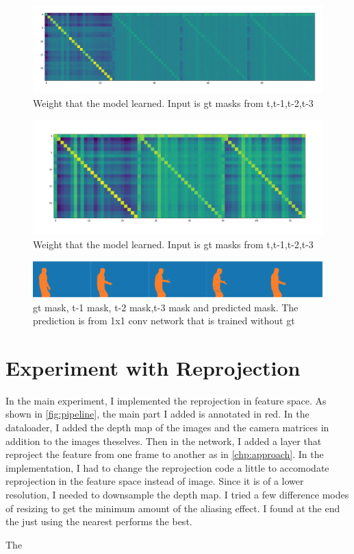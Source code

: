 \begin{figure}
\centering
\includegraphics[scale=0.1]{fig/weights_4.png}
\caption{Weight that the model learned. Input is gt masks from t,t-1,t-2,t-3}
\label{fig:w4}
\end{figure}
\begin{figure}
\centering
\includegraphics[scale=0.12]{fig/weights_3.png}
\caption{Weight that the model learned. Input is gt masks from t,t-1,t-2,t-3}
\label{fig:w3}
\end{figure}

\begin{figure}
\centering
\includegraphics[scale=0.23]{fig/pred.png}
\caption{gt mask, t-1 mask, t-2 mask,t-3 mask and predicted mask. The prediction is from 1x1 conv network that is trained without gt}
\label{fig:plot1}
\end{figure}




\section{Experiment with Reprojection}
In the main experiment, I implemented the reprojection in feature space. As shown in \ref{fig:pipeline}, the main part I added is annotated in red. In the dataloader, I added the depth map of the images and the camera matrices in addition to the images theselves. Then in the network, I added a layer that reproject the feature from one frame to another as in \ref{chp:approach}. In the implementation, I had to change the reprojection code a little to accomodate reprojection in the feature space instead of image. Since it is of a lower resolution, I needed to downsample the depth map. I tried a few difference modes of resizing to get the minimum amount of the aliasing effect. I found at the end the just using the nearest performs the best. 

The 

